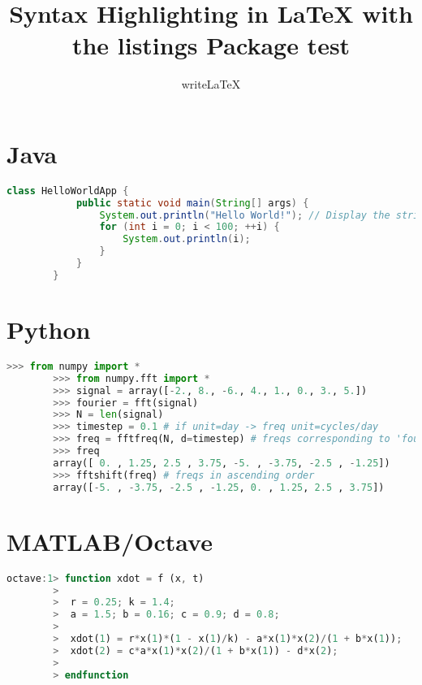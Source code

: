 \documentclass[12pt]{article}
\title{Syntax Highlighting in LaTeX with the listings Package test}
\author{writeLaTeX}
\begin{document}
	
	\maketitle
	
	\section{Java}
	\begin{lstlisting}[language=java]
		class HelloWorldApp {
			public static void main(String[] args) {
				System.out.println("Hello World!"); // Display the string.
				for (int i = 0; i < 100; ++i) {
					System.out.println(i);
				}
			}
		}
	\end{lstlisting}
	
	\section{Python}
	\begin{lstlisting}[language=python]
		>>> from numpy import *
		>>> from numpy.fft import *
		>>> signal = array([-2., 8., -6., 4., 1., 0., 3., 5.])
		>>> fourier = fft(signal)
		>>> N = len(signal)
		>>> timestep = 0.1 # if unit=day -> freq unit=cycles/day
		>>> freq = fftfreq(N, d=timestep) # freqs corresponding to 'fourier'
		>>> freq
		array([ 0. , 1.25, 2.5 , 3.75, -5. , -3.75, -2.5 , -1.25])
		>>> fftshift(freq) # freqs in ascending order
		array([-5. , -3.75, -2.5 , -1.25, 0. , 1.25, 2.5 , 3.75])
	\end{lstlisting}
	
	\section{MATLAB/Octave}
	\begin{lstlisting}[language=octave]
		octave:1> function xdot = f (x, t)
		>
		>  r = 0.25; k = 1.4;
		>  a = 1.5; b = 0.16; c = 0.9; d = 0.8;
		>
		>  xdot(1) = r*x(1)*(1 - x(1)/k) - a*x(1)*x(2)/(1 + b*x(1));
		>  xdot(2) = c*a*x(1)*x(2)/(1 + b*x(1)) - d*x(2);
		>
		> endfunction
	\end{lstlisting}
	
\end{document}
